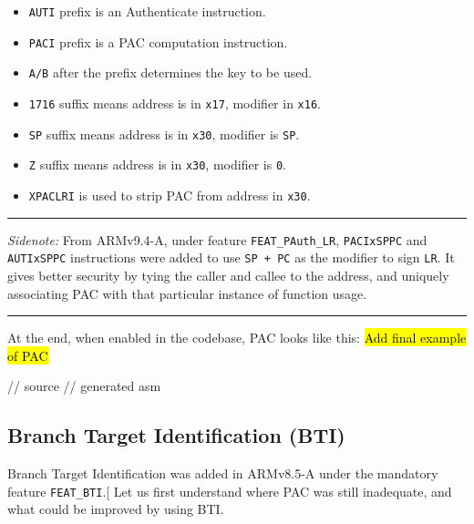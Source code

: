 \documentclass[a4paper, nobind]{templates/ociamthesis}
\providecommand{\tightlist}{%
  \setlength{\itemsep}{0pt}\setlength{\parskip}{0pt}}
\newenvironment{Shaded}{\begin{snugshade}}{\end{snugshade}}
\newcommand{\NormalTok}[1]{#1}
\renewenvironment{Shaded}
{
  \vspace{10pt}%
  \begin{snugshade}%
}{%
  \end{snugshade}%
  \vspace{8pt}%
}
\begin{document}
\begin{itemize}
\tightlist
\item
  \texttt{AUTI} prefix is an Authenticate instruction.
\item
  \texttt{PACI} prefix is a PAC computation instruction.
\item
  \texttt{A/B} after the prefix determines the key to be used.
\item
  \texttt{1716} suffix means address is in \texttt{x17}, modifier in \texttt{x16}.
\item
  \texttt{SP} suffix means address is in \texttt{x30}, modifier is \texttt{SP}.
\item
  \texttt{Z} suffix means address is in \texttt{x30}, modifier is \texttt{0}.
\item
  \texttt{XPACLRI} is used to strip PAC from address in \texttt{x30}.
\end{itemize}

\begin{center}\rule{0.5\linewidth}{0.5pt}\end{center}

\emph{Sidenote:}
From ARMv9.4-A, under feature \texttt{FEAT\_PAuth\_LR}, \texttt{PACIxSPPC} and \texttt{AUTIxSPPC}
instructions were added to use \texttt{SP\ +\ PC} as the modifier to sign \texttt{LR}.
It gives better security by tying the caller and callee to the address,
and uniquely associating PAC with that particular instance of function usage.

\begin{center}\rule{0.5\linewidth}{0.5pt}\end{center}

At the end, when enabled in the codebase, PAC looks like this:
\hl{Add final example of PAC}

\begin{Shaded}
\begin{Highlighting}[]
\NormalTok{// source}
\NormalTok{// generated asm}
\end{Highlighting}
\end{Shaded}

\subsection{Branch Target Identification (BTI)}\label{bti-bg}

Branch Target Identification was added in ARMv8.5-A under the mandatory feature \texttt{FEAT\_BTI}.{[}\citeproc{ref-arm-feat-names}{9}{]}
Let us first understand where PAC was still inadequate, and what could be improved by using BTI.
\end{document}
